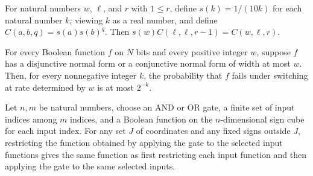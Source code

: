 \begin{theorem}
\label{FABL.circuitCompressionRate_split}
\leanok
{}
For natural numbers $w$, $\ell$, and $r$ with $1 \le r$, define $s(k)=1/(10k)$ for each
natural number $k$, viewing $k$ as a real number, and define $C(a,b,q)=s(a)s(b)^q$. Then
$s(w)C(\ell,\ell,r-1)=C(w,\ell,r)$.
\end{theorem}

\begin{definition}
\label{FABL.HasHalfSwitchingBound}
\leanok
{}
For every Boolean function $f$ on $N$ bits and every positive integer $w$, suppose $f$
has a disjunctive normal form or a conjunctive normal form of width at most $w$. Then,
for every nonnegative integer $k$, the probability that $f$ fails under switching at
rate determined by $w$ is at most $2^{-k}$.
\end{definition}

\begin{theorem}
\label{FABL.CircuitGate.reindexedSignRestriction_evalFinsetFunction}
\leanok
{}
Let $n,m$ be natural numbers, choose an AND or OR gate, a finite set of input indices
among $m$ indices, and a Boolean function on the $n$-dimensional sign cube for each
input index. For any set $J$ of coordinates and any fixed signs outside $J$, restricting
the function obtained by applying the gate to the selected input functions gives the
same function as first restricting each input function and then applying the gate to the
same selected inputs.
\end{theorem}

